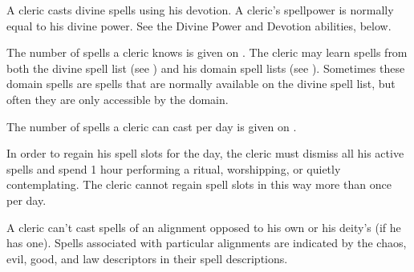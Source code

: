 A cleric casts divine spells using his devotion.
A cleric's spellpower is normally equal to his divine power.
See the Divine Power and Devotion abilities, below.

The number of spells a cleric knows is given on .
The cleric may learn spells from both the divine spell list (see ) and his domain spell lists (see ).
Sometimes these domain spells are spells that are normally available on the divine spell list, but often they are only accessible by the domain.

The number of spells a cleric can cast per day is given on .

In order to regain his spell slots for the day, the cleric must dismiss all his active spells and spend 1 hour performing a ritual, worshipping, or quietly contemplating.
The cleric cannot regain spell slots in this way more than once per day.

A cleric can't cast spells of an alignment opposed to his own or his deity's (if he has one).
Spells associated with particular alignments are indicated by the chaos, evil, good, and law descriptors in their spell descriptions.

